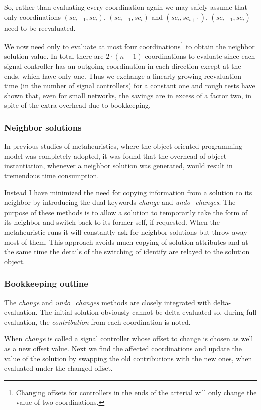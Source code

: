 So, rather than evaluating every coordination again we may safely assume that only coordinations $(sc_{i-1},sc_{i})$, $(sc_{i-1},sc_{i})$ and $(sc_{i},sc_{i+1})$, $(sc_{i+1},sc_{i})$ need to be reevaluated. 

We now need only to evaluate at most four coordinations\footnote{Changing offsets for controllers in the ends of the arterial will only change the value of two coordinations.} to obtain the neighbor solution value. In total there are $2\cdot (n-1)$ coordinations to evaluate since each signal controller has an outgoing coordination in each direction except at the ends, which have only one. Thus we exchange a linearly growing reevaluation time (in the number of signal controllers) for a constant one and rough tests have shown that, even for small networks, the savings are in excess of a factor two, in spite of the extra overhead due to bookkeeping.

\subsubsection*{Neighbor solutions}
In previous studies of metaheuristics, where the object oriented programming model was completely adopted, it was found that the overhead of object instantiation, whenever a neighbor solution was generated, would result in tremendous time consumption. 

Instead I have minimized the need for copying information from a solution to its neighbor by introducing the dual keywords \textit{change} and \textit{undo\_changes}. The purpose of these methods is to allow a solution to temporarily take the form of its neighbor and switch back to its former self, if requested. 
When the metaheuristic runs it will constantly ask for neighbor solutions but throw away most of them. This approach avoids much copying of solution attributes and at the same time the details of the switching of identify are relayed to the solution object.

\subsubsection*{Bookkeeping outline}
The \textit{change} and \textit{undo\_changes} methods are closely integrated with delta-evaluation. The initial solution obviously cannot be delta-evaluated so, during full evaluation, the \textit{contribution} from each coordination is noted. 

When \textit{change} is called a signal controller whose offset to change is chosen as well as a new offset value. Next we find the affected coordinations and update the value of the solution by swapping the old contributions with the new ones, when evaluated under the changed offset.

